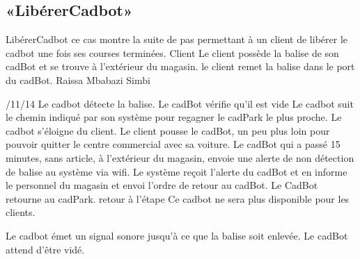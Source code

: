 \subsection{«LibérerCadbot»}
\startCU
\nom LibérerCadbot
\but ce cas montre la suite de pas permettant à un client de libérer le cadbot une fois ses courses terminées.
\acteur Client
\precondition Le client possède la balise de son cadBot et se trouve à l'extérieur du magasin.
\declenchement le client remet la balise dans le port du cadBot.
\auteur Raissa Mbabazi Simbi
\date 7/11/14
\nominal %
\startnominal
\etape[LC:SA2] Le cadbot détecte la balise.
\etape[LC:VIDE] Le cadBot vérifie qu'il est vide
\etape[LC:RETOUR] Le cadbot suit le chemin indiqué par son système pour regagner le cadPark le plus proche.
\stopnominal
\postcondition Le cadbot s'éloigne du client.
\alternatifs
\startalternatif[LC:SA2] %
\etape Le client pousse le cadBot, un peu plus loin pour pouvoir quitter le centre commercial avec sa voiture.
\etape Le cadBot qui a passé 15 minutes, sans article, à l'extérieur du magasin, envoie une alerte de non détection de balise au système via wifi.
\etape Le système reçoit l'alerte du cadBot et en informe le personnel du magasin et envoi l'ordre de retour au cadBot.
\etape Le CadBot retourne au cadPark.
\etape retour à l'étape \in[LC:RETOUR]
\stopcondition
\postcondition Ce cadbot ne sera plus disponible pour les clients.
\stopalternatif




\exception

\startalternatif[LC:VIDE] %
\etape Le cadbot émet un signal sonore jusqu'à ce que la balise soit enlevée.
\stopcondition
\postcondition Le cadBot attend d'être vidé.
\stopalternatif

\stopCU
